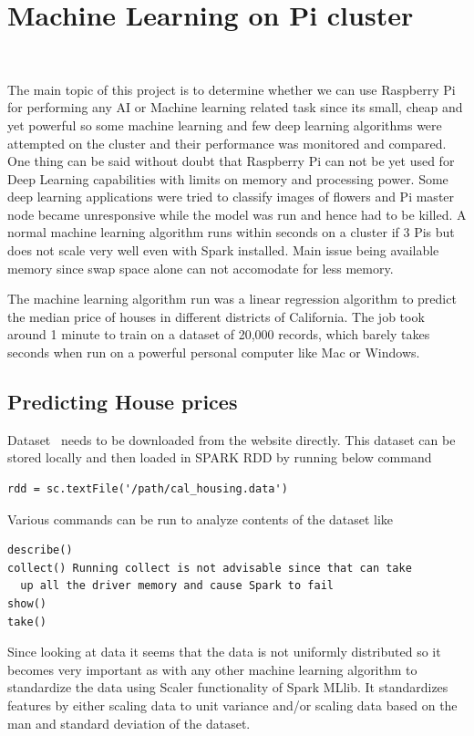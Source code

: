 \section{Machine Learning on Pi cluster}\

The main topic of this project is to determine whether we can use
Raspberry Pi for performing any AI or Machine learning related task
since its small, cheap and yet powerful so some machine learning and
few deep learning algorithms were attempted on the cluster and their
performance was monitored and compared. One thing can be said without
doubt that Raspberry Pi can not be yet used for Deep Learning
capabilities with limits on memory and processing power. Some deep
learning applications were tried to classify images of flowers and Pi
master node became unresponsive while the model was run and hence had
to be killed. A normal machine learning algorithm runs within seconds
on a cluster if 3 Pis but does not scale very well even with Spark
installed. Main issue being available memory since swap space alone
can not accomodate for less memory.

The machine learning algorithm run was a linear regression algorithm
to predict the median price of houses in different districts of
California. The job took around 1 minute to train on a dataset of
20,000 records, which barely takes seconds when run on a powerful
personal computer like Mac or Windows.

\subsection{Predicting House prices }   

Dataset~\cite{hid-sp18-510-dataset} needs to be downloaded from the
website directly. This dataset can be stored locally and then loaded
in SPARK RDD by running below command

\begin{verbatim}
rdd = sc.textFile('/path/cal_housing.data')
\end{verbatim} 

Various commands can be run to analyze contents of the dataset like 
\begin{verbatim}
describe()
collect() Running collect is not advisable since that can take
  up all the driver memory and cause Spark to fail
show()
take()
\end{verbatim}

Since looking at data it seems that the data is not uniformly
distributed so it becomes very important as with any other machine
learning algorithm to standardize the data using Scaler functionality
of Spark MLlib. It standardizes features by either scaling data to
unit variance and/or scaling data based on the man and standard
deviation of the dataset.

